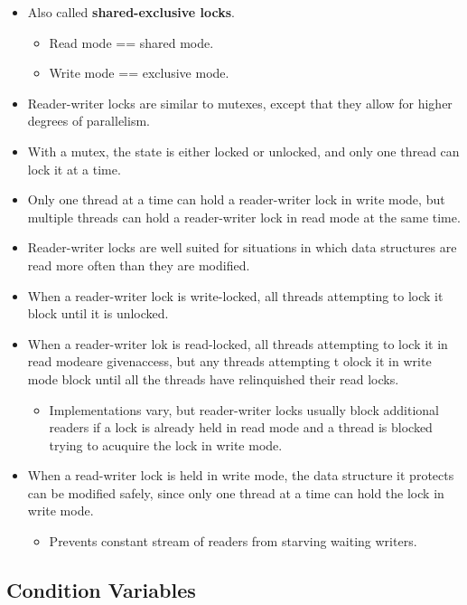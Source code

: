\documentclass{article}
\begin{document}
\begin{itemize}
    \item Also called \textbf{shared-exclusive locks}.
    \begin{itemize}
        \item Read mode == shared mode.
        \item Write mode == exclusive mode.
    \end{itemize}
\item Reader-writer locks are similar to mutexes, except that they allow for higher degrees of parallelism.
\item With a mutex, the state is either locked or unlocked, and only one thread can lock it at a time.
\item Only one thread at a time can hold a reader-writer lock in write mode, but multiple threads can hold a reader-writer lock in read mode at the same time.
\item Reader-writer locks are well suited for situations in which data structures are read more often than they are modified.


\item When a reader-writer lock is write-locked, all threads attempting to lock it block until it is unlocked.
\item When a reader-writer lok is read-locked, all threads attempting to lock it in read modeare givenaccess, but any threads attempting t olock it in write mode block until all the threads have relinquished their read locks.
    \begin{itemize}
        \item Implementations vary, but reader-writer locks usually block additional readers if a lock is already held in read mode and a thread is blocked trying to acuquire the lock in write mode.
    \end{itemize}
\item When a read-writer lock is held in write mode, the data structure it protects can be modified safely, since only one thread at a time can hold the lock in write mode.
    \begin{itemize}
        \item Prevents constant stream of readers from starving waiting writers.
    \end{itemize}
\end{itemize}

\subsection{Condition Variables}
\end{document}
